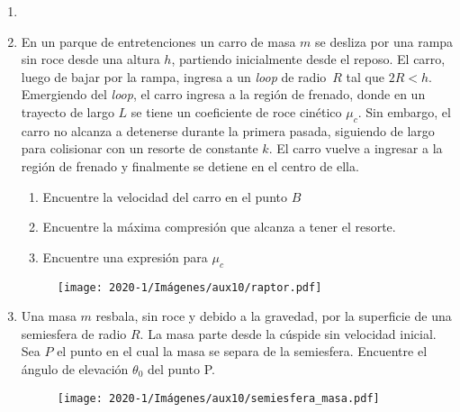 \documentclass[letterpaper,11pt]{article}
\begin{document}
\vspace{-1cm}
\begin{enumerate}\setlength{\itemsep}{0.4cm}


\item[]

\item En un parque de entretenciones un carro de masa $m$ se desliza por una rampa sin roce desde una altura $h$, partiendo inicialmente desde el reposo. El carro, luego de bajar por la rampa, ingresa a un \textit{loop} de radio~$R$ tal que $2R<h$. Emergiendo del \textit{loop}, el carro ingresa a la región de frenado, donde en un trayecto de largo $L$ se tiene un coeficiente de roce cinético $\mu_c$. Sin embargo, el carro no alcanza a detenerse durante la primera pasada, siguiendo de largo para colisionar con un resorte de constante $k$. El carro vuelve a ingresar a la región de frenado y finalmente se detiene en el centro de ella.
\begin{enumerate}
    \item Encuentre la velocidad del carro en el punto $B$
    \item Encuentre la máxima compresión que alcanza a tener el resorte.
    \item Encuentre una expresión para $\mu_c$
\end{enumerate}

\begin{figure}[h!]
    \centering
    \texttt{[image: 2020-1/Imágenes/aux10/raptor.pdf]}
\end{figure}

\item Una masa $m$ resbala, sin roce y debido a la gravedad, por la superficie de una semiesfera de radio $R$. La masa parte desde la cúspide sin velocidad inicial. Sea $P$ el punto en el cual la masa se separa de la semiesfera. Encuentre el ángulo de elevación $\theta_0$ del punto P.

\begin{figure}[h!]
    \centering
    \texttt{[image: 2020-1/Imágenes/aux10/semiesfera\_masa.pdf]}
\end{figure}

\end{enumerate}
\end{document}
